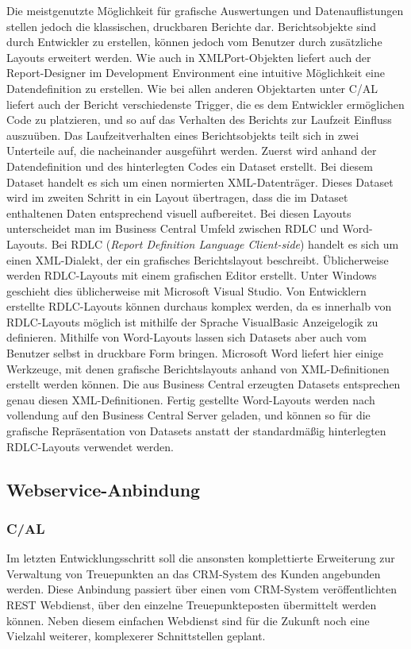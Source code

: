 Die meistgenutzte Möglichkeit für grafische Auswertungen und Datenauflistungen stellen jedoch die klassischen, druckbaren Berichte dar. Berichtsobjekte sind durch Entwickler zu erstellen, können jedoch vom Benutzer durch zusätzliche Layouts erweitert werden. Wie auch in XMLPort-Objekten liefert auch der Report-Designer im Development Environment eine intuitive Möglichkeit eine Datendefinition zu erstellen. Wie bei allen anderen Objektarten unter C/AL liefert auch der Bericht verschiedenste Trigger, die es dem Entwickler ermöglichen Code zu platzieren, und so auf das Verhalten des Berichts zur Laufzeit Einfluss auszuüben. Das Laufzeitverhalten eines Berichtsobjekts teilt sich in zwei Unterteile auf, die nacheinander ausgeführt werden. Zuerst wird anhand der Datendefinition und des hinterlegten Codes ein Dataset erstellt. Bei diesem Dataset handelt es sich um einen normierten XML-Datenträger. Dieses Dataset wird im zweiten Schritt in ein Layout übertragen, dass die im Dataset enthaltenen Daten entsprechend visuell aufbereitet.
Bei diesen Layouts unterscheidet man im Business Central Umfeld zwischen RDLC und Word-Layouts. Bei RDLC (\textit{Report Definition Language Client-side}) handelt es sich um einen XML-Dialekt, der ein grafisches Berichtslayout beschreibt. Üblicherweise werden RDLC-Layouts mit einem grafischen Editor erstellt. Unter Windows geschieht dies üblicherweise mit Microsoft Visual Studio. Von Entwicklern erstellte RDLC-Layouts können durchaus komplex werden, da es innerhalb von RDLC-Layouts möglich ist mithilfe der Sprache VisualBasic Anzeigelogik zu definieren. Mithilfe von Word-Layouts lassen sich Datasets aber auch vom Benutzer selbst in druckbare Form bringen. Microsoft Word liefert hier einige Werkzeuge, mit denen grafische Berichtslayouts anhand von XML-Definitionen erstellt werden können. Die aus Business Central erzeugten Datasets entsprechen genau diesen XML-Definitionen. Fertig gestellte Word-Layouts werden nach vollendung auf den Business Central Server geladen, und können so für die grafische Repräsentation von Datasets anstatt der standardmäßig hinterlegten RDLC-Layouts verwendet werden.

\subsection{Webservice-Anbindung}
\subsubsection{C/AL}
Im letzten Entwicklungsschritt soll die ansonsten komplettierte Erweiterung zur Verwaltung von Treuepunkten an das CRM-System des Kunden angebunden werden. Diese Anbindung passiert über einen vom CRM-System veröffentlichten REST Webdienst, über den einzelne Treuepunkteposten übermittelt werden können. Neben diesem einfachen Webdienst sind für die Zukunft noch eine Vielzahl weiterer, komplexerer Schnittstellen geplant. 

